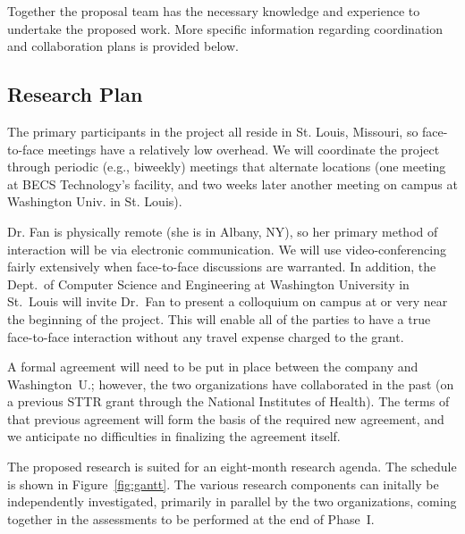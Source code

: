 Together the proposal team has the necessary knowledge and experience to undertake the proposed work. 
More specific information regarding coordination and collaboration plans is
provided below.

\subsection{Research Plan}

The primary participants in the project all reside in St. Louis, Missouri,
so face-to-face meetings have a relatively low overhead. We will coordinate
the project through periodic (e.g., biweekly) meetings that alternate
locations (one meeting at BECS Technology's facility, and two weeks later
another meeting on campus at Washington Univ. in St. Louis).

Dr. Fan is physically remote (she is in Albany, NY), so her primary
method of interaction will be via electronic communication.  We will
use video-conferencing fairly extensively when face-to-face discussions
are warranted.  In addition, the Dept.~of Computer Science and Engineering
at Washington University in St.~Louis
will invite Dr.~Fan to present a colloquium on campus at or very near
the beginning of the project.  This will enable all of the parties to
have a true face-to-face interaction without any travel expense charged
to the grant.

A formal agreement will need to be put in place between the company and
Washington~U.; however, the two organizations have collaborated in the
past (on a previous STTR grant through the National Institutes of Health).
The terms of that previous agreement will form the
basis of the required new agreement, and we anticipate no difficulties
in finalizing the agreement itself.

The proposed research is suited for an eight-month research agenda.
The schedule is shown in Figure~\ref{fig:gantt}.
The various research components can initally be independently investigated,
primarily in parallel by the two organizations, coming together
in the assessments to be performed at the end of Phase~I.

